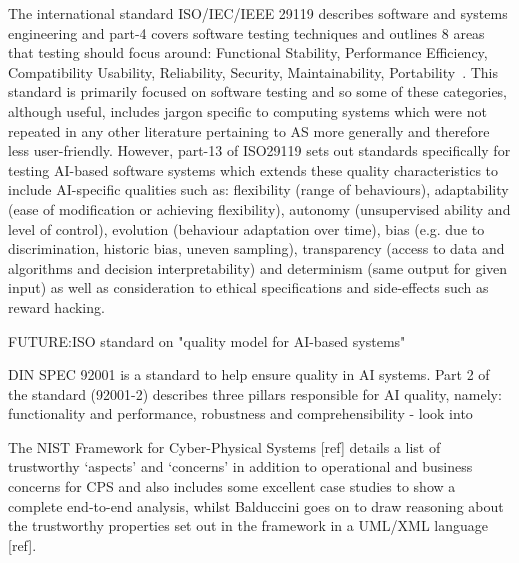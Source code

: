 The international standard ISO/IEC/IEEE 29119 describes software and systems engineering and part-4 covers software testing techniques and outlines 8 areas that testing should focus around: Functional Stability, Performance Efficiency, Compatibility
Usability, Reliability, Security, Maintainability, Portability~\cite{ISO29119}. 
%
This standard is primarily focused on software testing and so some of these categories, although useful, includes jargon specific to computing systems which were not repeated in any other literature pertaining to AS more generally and therefore less user-friendly. However, part-13 of ISO29119 sets out standards specifically for testing AI-based software systems which extends these quality characteristics to include AI-specific qualities such as: flexibility (range of behaviours), adaptability (ease of modification or achieving flexibility), autonomy (unsupervised ability and level of control), evolution (behaviour adaptation over time), bias (e.g. due to discrimination, historic bias, uneven sampling), transparency (access to data and algorithms and decision interpretability) and determinism (same output for given input) as well as consideration to ethical specifications and side-effects such as reward hacking. 

FUTURE:ISO standard on "quality model for AI-based systems"


DIN SPEC 92001 is a standard to help ensure quality in AI systems. Part 2 of the standard (92001-2) describes three pillars responsible for AI quality, namely: functionality and performance, robustness and comprehensibility - look into

The NIST Framework for Cyber-Physical Systems [ref] details a list of trustworthy `aspects' and `concerns' in addition to operational and business concerns for CPS and also includes some excellent case studies to show a complete end-to-end analysis, whilst Balduccini goes on to draw reasoning about the trustworthy properties set out in the framework in a UML/XML language [ref].  
%






